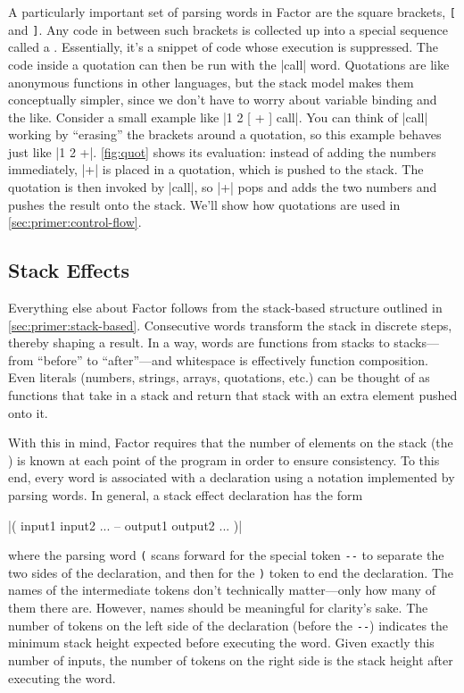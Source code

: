 

A particularly important set of parsing words in Factor are the square
brackets, \Verb|[| and \Verb|]|.  Any code in between such brackets is
collected up into a special sequence called a .  Essentially,
it's a snippet of code whose execution is suppressed.  The code inside a
quotation can then be run with the \factor|call| word.  Quotations are like
anonymous functions in other languages, but the stack model makes them
conceptually simpler, since we don't have to worry about variable binding and
the like.  Consider a small example like \factor|1 2 [ + ] call|.  You can
think of \factor|call| working by ``erasing'' the brackets around a quotation,
so this example behaves just like \factor|1 2 +|.  \vref{fig:quot} shows its
evaluation: instead of adding the numbers immediately, \factor|+| is placed in
a quotation, which is pushed to the stack.  The quotation is then invoked by
\factor|call|, so \factor|+| pops and adds the two numbers and pushes the
result onto the stack.  We'll show how quotations are used in
\cref{sec:primer:control-flow}.

\subsection{Stack Effects}\label{sec:primer:effects}

Everything else about Factor follows from the stack-based structure outlined in
\cref{sec:primer:stack-based}.  Consecutive words transform the stack in
discrete steps, thereby shaping a result.  In a way, words are functions from
stacks to stacks---from ``before'' to ``after''---and whitespace is effectively
function composition.  Even literals (numbers, strings, arrays, quotations,
etc.) can be thought of as functions that take in a stack and return that stack
with an extra element pushed onto it.

With this in mind, Factor requires that the number of elements on the stack
(the ) is known at each point of the program in order to
ensure consistency.  To this end, every word is associated with a  declaration using a notation implemented by parsing words.  In general,
a stack effect declaration has the form
%
\begin{center} \factor|( input1 input2 ... -- output1 output2 ... )|
\end{center}
%
\noindent where the parsing word \Verb|(| scans forward for the special token
\Verb|--| to separate the two sides of the declaration, and then for the
\Verb|)| token to end the declaration.  The names of the intermediate tokens
don't technically matter---only how many of them there are.  However, names
should be meaningful for clarity's sake.  The number of tokens on the left side
of the declaration (before the \Verb|--|) indicates the minimum stack height
expected before executing the word.  Given exactly this number of inputs, the
number of tokens on the right side is the stack height after executing the
word.

